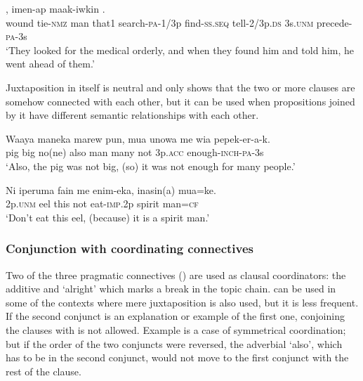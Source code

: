 
\ea%
\label{ex:8:x1371}
\gll {}        ,  imen-ap   maak-iwkin    .\\
 wound  tie-\textsc{nmz}  man  that1  search-\textsc{pa}-1/3p  find-\textsc{ss}.\textsc{seq} tell-2/3p.\textsc{ds}  3s.\textsc{unm}  precede-\textsc{pa}-3s\\ 
\glt`They looked for the medical orderly, and when they found him and told him, he went ahead of them.'
\z


Juxtaposition in itself is neutral and only shows that the two or more clauses are somehow connected with each other, but it can be used when propositions joined by it have different semantic relationships with each other.

\ea%
\label{ex:8:x1404}
\gll Waaya  maneka  marew  pun,  mua  unowa  me  wia pepek-er-a-k.\\
 pig  big  no(ne)  also  man  many  not  3p.\textsc{acc} enough-\textsc{inch}-\textsc{pa}-3s\\
\glt`Also, the pig was not big, (so) it was not enough for many people.'
\z


\ea%
\label{ex:8:x1425}
\gll Ni  iperuma  fain  me  enim-eka,  inasin(a)  mua=ke. \\
2p.\textsc{unm}  eel  this  not  eat-\textsc{imp}.2p  spirit  man=\textsc{cf}      \\
\glt`Don't eat this eel, (because) it is a spirit man.'
\z


\subsubsection{Conjunction with coordinating connectives} \label{sec:8.1.1.2}

Two of the three pragmatic connectives () are used as clausal coordinators: the additive   and  `alright' which marks a break in the topic chain.  can be used in some of the contexts where mere juxtaposition is also used, but it is less frequent. If the second conjunct is an explanation or example of the first one, conjoining the clauses with  is not allowed. Example  is a case of symmetrical coordination; but if the order of the two conjuncts were reversed, the adverbial  `also', which has to be in the second conjunct, would not move to the first conjunct with the rest of the clause.

